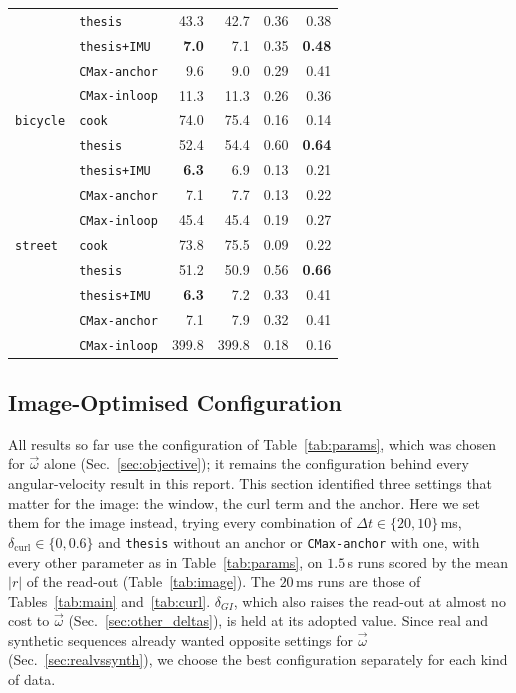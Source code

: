 \documentclass[journal]{IEEEtran}
\newcommand{\wvec}{\vec{\omega}}
\begin{document}
\begin{table}[!t]
\begin{tabular}{@{}llrrrr@{}}
                      & \texttt{thesis}       & 43.3 & 42.7 & 0.36 & 0.38 \\
                      & \texttt{thesis+IMU}   & \textbf{7.0} & 7.1 & 0.35 & \textbf{0.48} \\
                      & \texttt{CMax-anchor}  & 9.6 & 9.0 & 0.29 & 0.41 \\
                      & \texttt{CMax-inloop}  & 11.3 & 11.3 & 0.26 & 0.36 \\
\midrule
\texttt{bicycle}      & \texttt{cook}         & 74.0 & 75.4 & 0.16 & 0.14 \\
                      & \texttt{thesis}       & 52.4 & 54.4 & 0.60 & \textbf{0.64} \\
                      & \texttt{thesis+IMU}   & \textbf{6.3} & 6.9 & 0.13 & 0.21 \\
                      & \texttt{CMax-anchor}  & 7.1 & 7.7 & 0.13 & 0.22 \\
                      & \texttt{CMax-inloop}  & 45.4 & 45.4 & 0.19 & 0.27 \\
\midrule
\texttt{street}       & \texttt{cook}         & 73.8 & 75.5 & 0.09 & 0.22 \\
                      & \texttt{thesis}       & 51.2 & 50.9 & 0.56 & \textbf{0.66} \\
                      & \texttt{thesis+IMU}   & \textbf{6.3} & 7.2 & 0.33 & 0.41 \\
                      & \texttt{CMax-anchor}  & 7.1 & 7.9 & 0.32 & 0.41 \\
                      & \texttt{CMax-inloop}  & 399.8 & 399.8 & 0.18 & 0.16 \\
\bottomrule
\end{tabular}
\end{table}

\subsection{Image-Optimised Configuration}
\label{sec:image_settings}

All results so far use the configuration of Table~\ref{tab:params}, which was chosen for $\wvec$ alone (Sec.~\ref{sec:objective}); it remains the configuration behind every angular-velocity result in this report. This section identified three settings that matter for the image: the window, the curl term and the anchor. Here we set them for the image instead, trying every combination of $\Delta t \in \{20, 10\}$\,ms, $\delta_{\text{curl}} \in \{0, 0.6\}$ and \texttt{thesis} without an anchor or \texttt{CMax-anchor} with one, with every other parameter as in Table~\ref{tab:params}, on $1.5$\,s runs scored by the mean $|r|$ of the read-out (Table~\ref{tab:image}). The $20$\,ms runs are those of Tables~\ref{tab:main} and~\ref{tab:curl}. $\delta_{G\!I}$, which also raises the read-out at almost no cost to $\wvec$ (Sec.~\ref{sec:other_deltas}), is held at its adopted value. Since real and synthetic sequences already wanted opposite settings for $\wvec$ (Sec.~\ref{sec:realvssynth}), we choose the best configuration separately for each kind of data.
\end{document}
